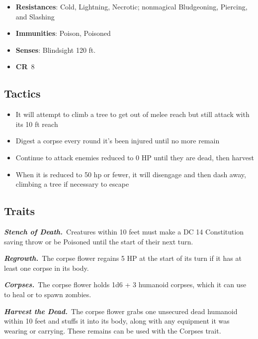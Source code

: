 \documentclass[10pt,twocolumn]{article}
\let\oldtextbf\textbf
\renewcommand{\textbf}[1]{\oldtextbf{{#1}}}
\providecommand{\tightlist}{
  \setlength{\itemsep}{4pt}
  \setlength{\topsep}{0pt}
  \setlength{\parsep}{0pt}
  \setlength{\parskip}{0pt}
  \setlength{\partopsep}{0pt}
}
\begin{document}
\setlength{\itemsep}{0pt}

\begin{itemize}
\tightlist
\item
  \textbf{Resistances}: Cold, Lightning, Necrotic; nonmagical
  Bludgeoning, Piercing, and Slashing
\item
  \textbf{Immunities}: Poison, Poisoned
\item
  \textbf{Senses}: Blindsight 120 ft.
\item
  \textbf{CR}~8
\end{itemize}

\subsection{Tactics}\label{tactics-1}

\setlength{\itemsep}{0pt}

\begin{itemize}
\tightlist
\item
  It will attempt to climb a tree to get out of melee reach but still
  attack with its 10 ft reach
\item
  Digest a corpse every round it's been injured until no more remain
\item
  Continue to attack enemies reduced to 0 HP until they are dead, then
  harvest
\item
  When it is reduced to 50 hp or fewer, it will disengage and then dash
  away, climbing a tree if necessary to escape
\end{itemize}

\subsection{Traits}\label{traits-1}

\emph{\textbf{Stench of Death.}}~Creatures within 10 feet must make a DC
14 Constitution saving throw or be Poisoned until the start of their
next turn.

\emph{\textbf{Regrowth.}}~The corpse flower regains 5 HP at the start of
its turn if it has at least one corpse in its body.

\emph{\textbf{Corpses.}}~The corpse flower holds 1d6 + 3 humanoid
corpses, which it can use to heal or to spawn zombies.

\emph{\textbf{Harvest the Dead.}}~The corpse flower grabs one unsecured
dead humanoid within 10 feet and stuffs it into its body, along with any
equipment it was wearing or carrying. These remains can be used with the
Corpses trait.
\end{document}
